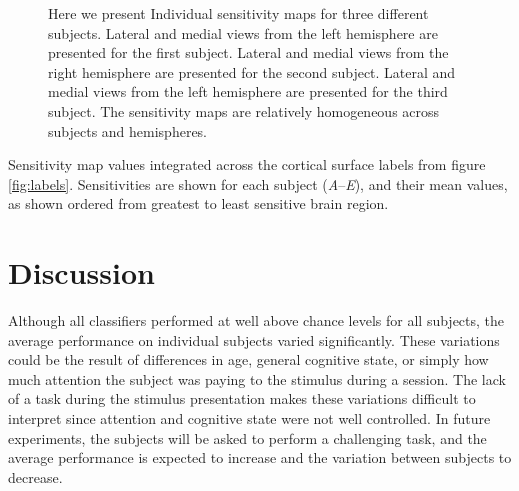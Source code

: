 \documentclass[5p,authoryear]{elsarticle}
\begin{document}
\begin{figure}[p]
\begin{subfigure}{0.3\textwidth}
\caption{}
\label{fig:s3-lh-medial-sensitivity}
\end{subfigure}
\caption{Here we present Individual sensitivity maps for three different subjects. 
Lateral  and medial  views from the left hemisphere are presented for the first subject.
Lateral  and medial  views from the right hemisphere are presented for the second subject.
Lateral  and medial  views from the left hemisphere are presented for the third subject.
The sensitivity maps are relatively homogeneous across subjects and hemispheres.}
\label{fig:individual-sensitivity}
\end{figure}

\begin{table}[p]
\centering

\caption{Sensitivity map values integrated across the cortical surface labels from figure \ref{fig:labels}. Sensitivities are shown for each subject (\emph{A}--\emph{E}), and their mean values, as shown ordered from greatest to least sensitive brain region.}
\label{tab:full-sensitivity}
\end{table}

\section{Discussion}
Although all classifiers performed at well above chance levels for all subjects, the average performance on individual subjects varied significantly.
These variations could be the result of differences in age, general cognitive state, or simply how much attention the subject was paying to the stimulus during a session.
The lack of a task during the stimulus presentation makes these variations difficult to interpret since attention and cognitive state were not well controlled.
In future experiments, the subjects will be asked to perform a challenging task, and the average performance is expected to increase and the variation between subjects to decrease.
\end{document}
